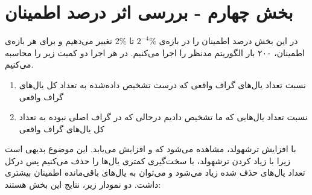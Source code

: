\documentclass{article}
\begin{document}
\section{بخش چهارم - بررسی اثر درصد اطمینان}
در این بخش درصد اطمینان را در بازه‌ی 
$2^{-4}\%$
تا 
$2\%$
تغییر می‌دهیم و برای هر بازه‌ی اطمینان، ۲۰۰ بار الگوریتم مدنظر را اجرا می‌کنیم. در هر اجرا دو کمیت زیر را محاسبه می‌کنیم.
\begin{enumerate}
	\item {}
	نسبت تعداد‌ یال‌های گراف واقعی که درست تشخیص داده‌شده به  تعداد کل یال‌های گراف واقعی
	\item {}
	نسبت تعداد یال‌هایی که ما تشخیص دادیم درحالی که در گراف اصلی نبوده به  تعداد کل یال‌های گراف واقعی
\end{enumerate}

با افزایش ترشهولد، مشاهده می‌شود که 
و
افزایش می‌یابد. این موضوع بدیهی است زیرا با زیاد کردن ترشهولد، با سخت‌گیری کمتری یال‌ها را حذف می‌کنیم پس در‌کل تعداد یال‌های حذف شده زیاد‌ می‌شود و می‌توان به یال‌های باقی‌مانده اطمینان بیشتری داشت. دو نمودار زیر، نتایج این بخش هستند:
\end{document}
